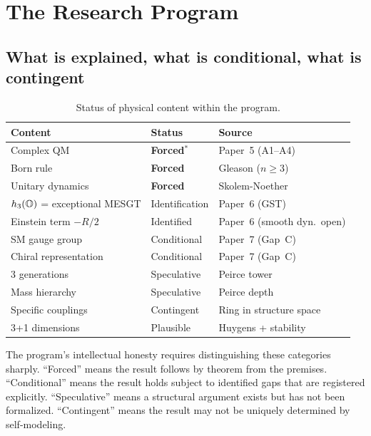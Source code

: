 
\section{The Research Program}
\label{sec:research-program}

\subsection{What is explained, what is conditional, what is contingent}
\label{subsec:status}

\begin{table}[ht]
\centering
\caption{Status of physical content within the program.}
\label{tab:status}
\small
\begin{tabular}{@{}p{3.2cm}p{1.6cm}p{2.5cm}@{}}
\toprule
Content & Status & Source \\
\midrule
Complex QM & \textbf{Forced$^*$} & Paper~5 (A1--A4) \\
Born rule & \textbf{Forced} & Gleason ($n \geq 3$) \\
Unitary dynamics & \textbf{Forced} & Skolem-Noether \\
$h_3(\mathbb{O})$ = exceptional MESGT & Identification & Paper~6 (GST) \\
Einstein term $-R/2$ & Identified & Paper~6 (smooth dyn.\ open) \\
SM gauge group & Conditional & Paper~7 (Gap~C) \\
Chiral representation & Conditional & Paper~7 (Gap~C) \\
3 generations & Speculative & Peirce tower \\
Mass hierarchy & Speculative & Peirce depth \\
Specific couplings & Contingent & Ring in structure space \\
3+1 dimensions & Plausible & Huygens + stability \\
\bottomrule
\end{tabular}
\end{table}

The program's intellectual honesty requires distinguishing these
categories sharply.  ``Forced'' means the result follows by theorem
from the premises.  ``Conditional'' means the result holds subject to
identified gaps that are registered explicitly.  ``Speculative'' means
a structural argument exists but has not been formalized.
``Contingent'' means the result may not be uniquely determined by
self-modeling.

